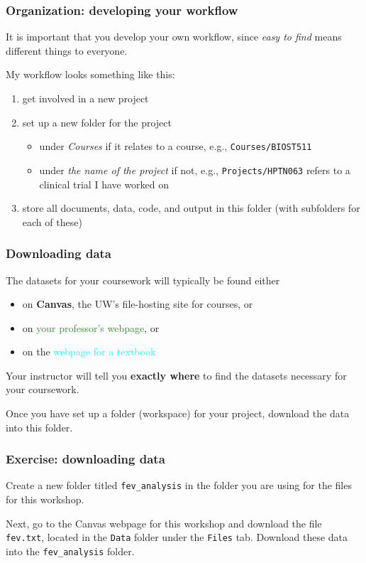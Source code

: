 \documentclass[11pt,dvipsnames]{beamer}
\begin{document}
\begin{frame}
\frametitle{Organization: developing your workflow}
It is important that you develop your own workflow, since \textit{easy to find} means different things to everyone.

My workflow looks something like this: \vspace{-0.3cm} \pause
\begin{enumerate}
\item get involved in a new project \pause
\item set up a new folder for the project 
\begin{itemize}
\item under \textit{Courses} if it relates to a course, e.g., \texttt{Courses/BIOST511}
\item under \textit{the name of the project} if not, e.g., \texttt{Projects/HPTN063} refers to a clinical trial I have worked on
\end{itemize} \pause
\item store all documents, data, code, and output in this folder (with subfolders for each of these)
\end{enumerate}
\end{frame}

\begin{frame}
\frametitle{Downloading data}
The datasets for your coursework will typically be found either \vspace{-0.3cm}
\begin{itemize}
\item on \textbf{Canvas}, the UW's file-hosting site for courses, or
\item on \textcolor{ForestGreen}{your professor's webpage}, or
\item on the \textcolor{cyan}{webpage for a textbook}
\end{itemize}

Your instructor will tell you \textbf{exactly where} to find the datasets necessary for your coursework.

Once you have set up a folder (workspace) for your project, download the data into this folder.
\end{frame}

\begin{frame}
\frametitle{Exercise: downloading data}
Create a new folder titled \texttt{fev\_analysis} in the folder you are using for the files for this workshop.

Next, go to the Canvas webpage for this workshop and download the file \texttt{fev.txt}, located in the \texttt{Data} folder under the \texttt{Files} tab. Download these data into the \texttt{fev\_analysis} folder.
\end{frame}
\end{document}
